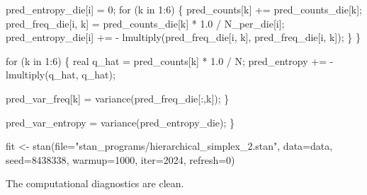 \documentclass[
  letterpaper,
  DIV=11,
  numbers=noendperiod]{scrartcl}
\newenvironment{Shaded}{\begin{snugshade}}{\end{snugshade}}
\newcommand{\AttributeTok}[1]{\textcolor[rgb]{0.40,0.45,0.13}{#1}}
\newcommand{\ControlFlowTok}[1]{\textcolor[rgb]{0.00,0.23,0.31}{#1}}
\newcommand{\DataTypeTok}[1]{\textcolor[rgb]{0.68,0.00,0.00}{#1}}
\newcommand{\DecValTok}[1]{\textcolor[rgb]{0.68,0.00,0.00}{#1}}
\newcommand{\FloatTok}[1]{\textcolor[rgb]{0.68,0.00,0.00}{#1}}
\newcommand{\FunctionTok}[1]{\textcolor[rgb]{0.28,0.35,0.67}{#1}}
\newcommand{\NormalTok}[1]{\textcolor[rgb]{0.00,0.23,0.31}{#1}}
\newcommand{\OtherTok}[1]{\textcolor[rgb]{0.00,0.23,0.31}{#1}}
\newcommand{\SpecialCharTok}[1]{\textcolor[rgb]{0.37,0.37,0.37}{#1}}
\newcommand{\StringTok}[1]{\textcolor[rgb]{0.13,0.47,0.30}{#1}}
\begin{document}
\begin{codelisting}
\begin{Shaded}
\begin{Highlighting}[]
\NormalTok{    pred\_entropy\_die[i] = }\DecValTok{0}\NormalTok{;}
    \ControlFlowTok{for}\NormalTok{ (k }\ControlFlowTok{in} \DecValTok{1}\NormalTok{:}\DecValTok{6}\NormalTok{) \{}
\NormalTok{      pred\_counts[k] += pred\_counts\_die[k];}
\NormalTok{      pred\_freq\_die[i, k] = pred\_counts\_die[k] * }\FloatTok{1.0}\NormalTok{ / N\_per\_die[i];}
\NormalTok{      pred\_entropy\_die[i] += {-} lmultiply(pred\_freq\_die[i, k],}
\NormalTok{                                         pred\_freq\_die[i, k]);}
\NormalTok{    \}}
\NormalTok{  \}}

  \ControlFlowTok{for}\NormalTok{ (k }\ControlFlowTok{in} \DecValTok{1}\NormalTok{:}\DecValTok{6}\NormalTok{) \{}
    \DataTypeTok{real}\NormalTok{ q\_hat = pred\_counts[k] * }\FloatTok{1.0}\NormalTok{ / N;}
\NormalTok{    pred\_entropy += {-} lmultiply(q\_hat, q\_hat);}

\NormalTok{    pred\_var\_freq[k] = variance(pred\_freq\_die[:,k]);}
\NormalTok{  \}}

\NormalTok{  pred\_var\_entropy = variance(pred\_entropy\_die);}
\NormalTok{\}}
\end{Highlighting}
\end{Shaded}

\end{codelisting}

\begin{Shaded}
\begin{Highlighting}[]
\NormalTok{fit }\OtherTok{\textless{}{-}} \FunctionTok{stan}\NormalTok{(}\AttributeTok{file=}\StringTok{"stan\_programs/hierarchical\_simplex\_2.stan"}\NormalTok{,}
            \AttributeTok{data=}\NormalTok{data, }\AttributeTok{seed=}\DecValTok{8438338}\NormalTok{,}
            \AttributeTok{warmup=}\DecValTok{1000}\NormalTok{, }\AttributeTok{iter=}\DecValTok{2024}\NormalTok{, }\AttributeTok{refresh=}\DecValTok{0}\NormalTok{)}
\end{Highlighting}
\end{Shaded}

The computational diagnostics are clean.

\begin{Shaded}
\end{Shaded}
\end{document}
